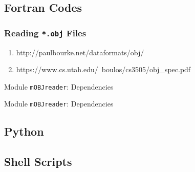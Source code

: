 \subsection{Fortran Codes}
\begin{frame}\frametitle{Reading \texttt{*.obj} Files}
\begin{enumerate}
	\item http://paulbourke.net/dataformats/obj/
	\item https://www.cs.utah.edu/~boulos/cs3505/obj_spec.pdf
\end{enumerate}
\end{frame}
\begin{frame}[fragile]{Module \texttt{mOBJreader}: Dependencies}
    
\end{frame}
\begin{frame}[fragile]{Module \texttt{mOBJreader}: Dependencies}
    
\end{frame}


\subsection{Python}
	
\subsection{Shell Scripts}

\endinput  %

